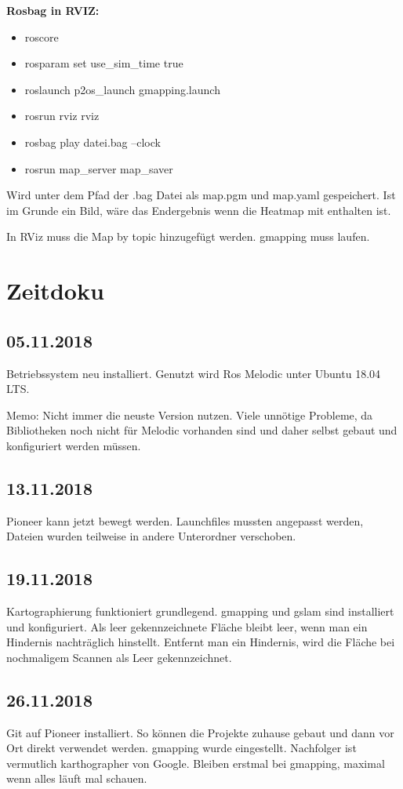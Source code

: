 \documentclass{scrartcl}%
\begin{document}
\textbf{Rosbag in RVIZ:}
\begin{itemize}
	\item roscore
	\item rosparam set use\_sim\_time true
	\item roslaunch p2os\_launch gmapping.launch
	\item rosrun rviz rviz
	\item rosbag play datei.bag --clock
	\item rosrun map\_server map\_saver
\end{itemize}
Wird unter dem Pfad der .bag Datei als map.pgm und map.yaml gespeichert. Ist im Grunde ein Bild, wäre das Endergebnis wenn die Heatmap mit enthalten ist.

In RViz muss die Map by topic hinzugefügt werden. gmapping muss laufen.

\section{Zeitdoku}
\subsection{05.11.2018}
Betriebssystem neu installiert. Genutzt wird Ros Melodic unter Ubuntu 18.04 LTS.

Memo: Nicht immer die neuste Version nutzen. Viele unnötige Probleme, da Bibliotheken noch nicht für Melodic vorhanden sind und daher selbst gebaut und konfiguriert werden müssen.

\subsection{13.11.2018}
Pioneer kann jetzt bewegt werden. Launchfiles mussten angepasst werden, Dateien wurden teilweise in andere Unterordner verschoben.

\subsection{19.11.2018}
Kartographierung funktioniert grundlegend. gmapping und gslam sind installiert und konfiguriert. Als leer gekennzeichnete Fläche bleibt leer, wenn man ein Hindernis nachträglich hinstellt. Entfernt man ein Hindernis, wird die Fläche bei nochmaligem Scannen als Leer gekennzeichnet.

\subsection{26.11.2018}
Git auf Pioneer installiert. So können die Projekte zuhause gebaut und dann vor Ort direkt verwendet werden. gmapping wurde eingestellt. Nachfolger ist vermutlich karthographer von Google. Bleiben erstmal bei gmapping, maximal wenn alles läuft mal schauen.
\end{document}
